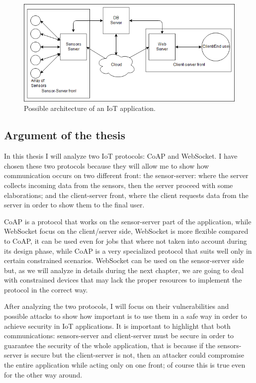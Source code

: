 	\begin{figure}
		\includegraphics[width=\linewidth]{intro-000.png}
		\caption{Possible architecture of an IoT application.}
		\label{fig:intro0}
	\end{figure}
	
	\subsection{Argument of the thesis}
	
	In this thesis I will analyze two IoT protocols: CoAP and WebSocket.\newline
	I have chosen these two protocols because they will allow me to show how communication occurs on two different front:
	the sensor-server: where the server collects incoming data from the sensors, then the server proceed with some elaborations;
	and the client-server front, where the client requests data from the server in order to show them to the final user.\newline

	CoAP is a protocol that works on the sensor-server part of the application, while WebSocket focus
	on the client/server side, WebSocket is more flexible compared to CoAP, it can be used even for
	jobs that where not taken into account during its design phase, while CoAP is a very specialized
	protocol that suits well only in certain constrained scenarios.\newline
	WebSocket can be used on the sensor-server side but, as we will analyze in details during the next chapter,
	we are going to deal with constrained devices that may lack the proper resources to implement the protocol in the correct way.\newline
	
	After analyzing the two protocols, I will focus on their vulnerabilities and possible attacks to show
	how important is to use them in a safe way in order to achieve security in IoT applications.\newline
	It is important to highlight that both communications: sensors-server and client-server must be secure in order to guarantee
	the security of the whole application, that is because if the sensors-server is secure but the client-server is not, then an
	attacker could compromise the entire application while acting only on one front; of course this is true even for the other way around.\newline
	

